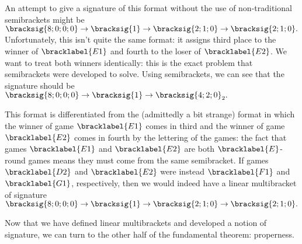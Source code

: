 {    

    An attempt to give a signature of this format without the use of non-traditional semibrackets might be $\bracksig{8;0;0;0} \to \bracksig{1} \to \bracksig{2;1;0} \to \bracksig{2;1;0}.$ Unfortunately, this isn't quite the same format: it assigns third place to the winner of $\bracklabel{E1}$ and fourth to the loser of $\bracklabel{E2}$. We want to treat both winners identically: this is the exact problem that semibrackets were developed to solve. Using semibrackets, we can see that the signature should be $\bracksig{8;0;0;0} \to \bracksig{1} \to \bracksig{4;2;0}_2.$


    This format is differentiated from the (admittedly a bit strange) format in which the winner of game $\bracklabel{E1}$ comes in third and the winner of game $\bracklabel{E2}$ comes in fourth by the lettering of the games: the fact that games $\bracklabel{E1}$ and $\bracklabel{E2}$ are both $\bracklabel{E}$-round games means they must come from the same semibracket. If games $\bracklabel{D2}$ and $\bracklabel{E2}$ were instead $\bracklabel{F1}$ and $\bracklabel{G1}$, respectively, then we would indeed have a linear multibracket of signature $\bracksig{8;0;0;0} \to \bracksig{1} \to \bracksig{2;1;0} \to \bracksig{2;1;0}.$

    Now that we have defined linear multibrackets and developed a notion of signature, we can turn to the other half of the fundamental theorem: properness.
}